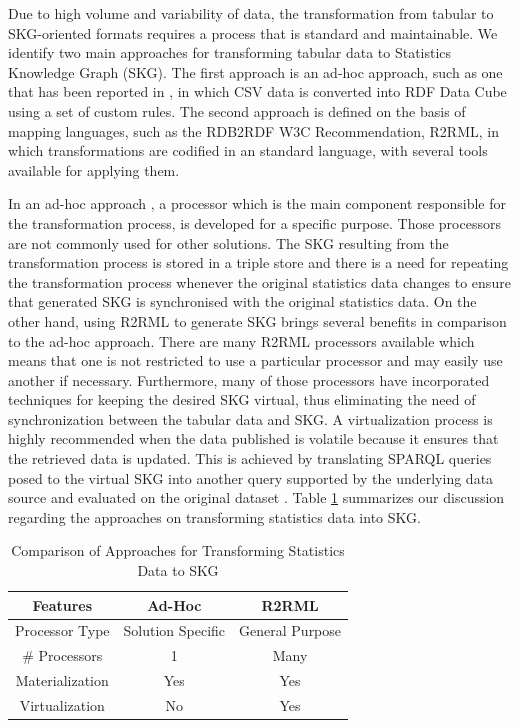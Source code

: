 Due to high volume and variability of data, the transformation from tabular to SKG-oriented formats requires a process that is standard and maintainable. We identify two main approaches for transforming tabular data to Statistics Knowledge Graph (SKG). The first approach is an ad-hoc approach, such as one that has been reported in \citep{corcho2017publishing}, in which CSV data is converted into RDF Data Cube \citep{cyganiak2012rdf} using a set of custom rules. The second approach is defined on the basis of mapping languages, such as the RDB2RDF W3C Recommendation, R2RML, in which transformations are codified in an standard language, with several tools available for applying them.

In an ad-hoc approach \citep{corcho2017publishing}, a processor which is the main component responsible for the transformation process, is developed for a specific purpose. Those processors are not commonly used for other solutions. The SKG resulting from the transformation process is stored in a triple store and there is a need for repeating the transformation process whenever the original statistics data changes to ensure that generated SKG is synchronised with the original statistics data. On the other hand, using R2RML to generate SKG brings several benefits in comparison to the ad-hoc approach. There are many R2RML processors \citep{priyatna2014formalisation,calvanese2017ontop} available which means that one is not restricted to use a particular processor and may easily use another if necessary. Furthermore, many of those processors have incorporated techniques for keeping the desired SKG virtual, thus eliminating the need of synchronization between the tabular data and SKG. A virtualization process is highly recommended when the data published is volatile because it ensures that the retrieved data is updated. This is achieved by translating SPARQL queries posed to the virtual SKG into another query supported by the underlying data source and evaluated on the original dataset \citep{poggi2008linking}. Table \ref{table:compare} summarizes our discussion regarding the approaches on transforming statistics data into SKG.

\begin{table}[tbp]
\caption[Transforming approaches for SKG]{Comparison of Approaches for Transforming Statistics Data to SKG}
\label{table:compare}
\begin{tabular}{c|c|c}
\hline
\textbf{Features} & \textbf{Ad-Hoc}   & \textbf{R2RML}  \\ \hline
Processor Type    & Solution Specific & General Purpose \\ 
\# Processors     & 1                 & Many            \\
Materialization   & Yes               & Yes             \\ 
Virtualization    & No                & Yes             \\ \hline
\end{tabular}
\end{table}

